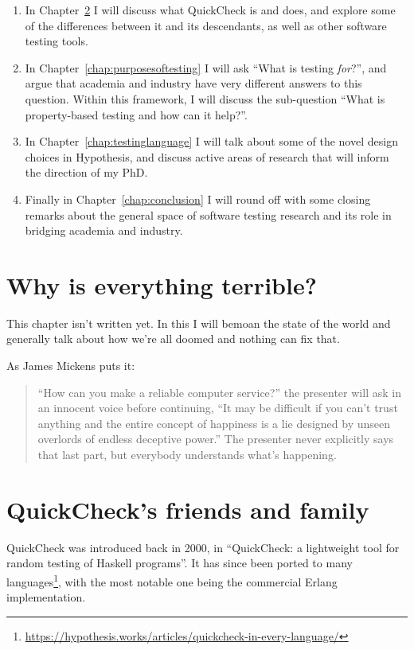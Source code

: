 \begin{enumerate}
\item In Chapter~\ref{chap:quickcheck} I will discuss what QuickCheck is and does,
and explore some of the differences between it and its descendants,
as well as other software testing tools.
\item In Chapter~\ref{chap:purposesoftesting} I will ask ``What is testing \emph{for}?'',
and argue that academia and industry have very different answers to this question.
Within this framework, I will discuss the sub-question ``What is property-based testing and how can it help?''.
\item In Chapter~\ref{chap:testinglanguage} I will talk about some of the novel design choices in Hypothesis,
and discuss active areas of research that will inform the direction of my PhD.
\item Finally in Chapter~\ref{chap:conclusion} I will round off with some closing remarks about the general space of software testing research and its role in bridging academia and industry.
\end{enumerate}

\chapter{Why is everything terrible?}

This chapter isn't written yet.
In this I will bemoan the state of the world and generally talk about how we're all doomed and nothing can fix that.

As James Mickens puts it\cite{mickens2014saddest}:

\begin{quote}
``How can you make a reliable computer service?'' the presenter will ask in an innocent voice before continuing,
``It may be difficult if you can’t trust anything and the entire concept of happiness is a lie designed by unseen overlords of endless deceptive power.''
The presenter never explicitly says that last part,
but everybody understands what's happening.
\end{quote}

\chapter{QuickCheck's friends and family}\label{chap:quickcheck}

QuickCheck was introduced back in 2000,
in ``QuickCheck: a lightweight tool for random testing of Haskell programs''\cite{DBLP:conf/icfp/ClaessenH00}.
It has since been ported to many languages\footnote{\url{https://hypothesis.works/articles/quickcheck-in-every-language/}},
with the most notable one being the commercial Erlang implementation\cite{DBLP:conf/erlang/ArtsHJW06}.

